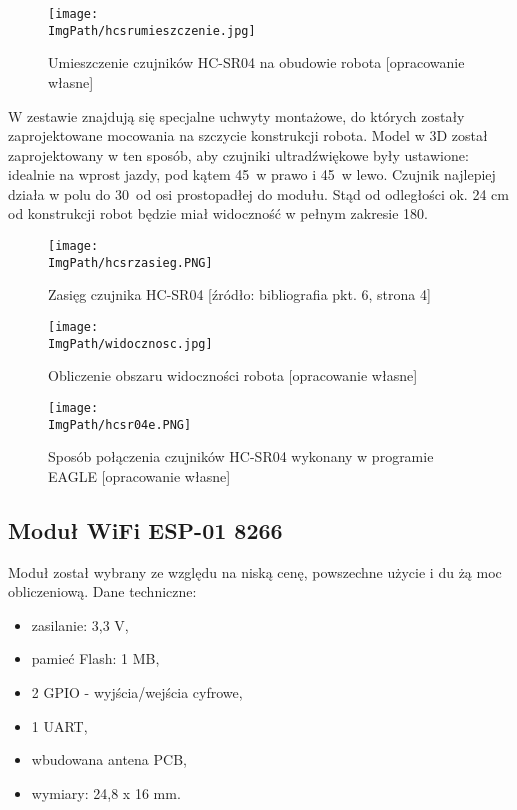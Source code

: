 \documentclass[a4paper,12pt,twoside,openany]{report}
\newcommand{\ImgPath}{.}
\begin{document}
\begin{figure}[!htbp]
	\begin{center}
\centering
\texttt{[image: \\ImgPath/hcsrumieszczenie.jpg]}
\end{center}
	\caption{Umieszczenie czujników HC-SR04 na obudowie robota [opracowanie własne]}
	\label{schematKomunikacji}
\end{figure}

W zestawie znajdują się specjalne uchwyty montażowe, do których zostały zaprojektowane mocowania na szczycie konstrukcji robota. Model w 3D został zaprojektowany w ten sposób, aby czujniki ultradźwiękowe były ustawione: idealnie na wprost jazdy, pod kątem 45\textdegree w prawo i 45\textdegree w lewo. Czujnik najlepiej działa w polu do 30\textdegree od osi prostopadłej do modułu. Stąd od odległości ok. 24 cm od konstrukcji robot będzie miał widoczność w pełnym zakresie 180\textdegree .

\begin{figure}[!htbp]
	\begin{center}
\centering
\texttt{[image: \\ImgPath/hcsrzasieg.PNG]}
\end{center}
	\caption{Zasięg czujnika HC-SR04 [źródło: bibliografia pkt. 6, strona 4]}
	\label{schematKomunikacji}
\end{figure}

\begin{figure}[!htbp]
	\begin{center}
\centering
\texttt{[image: \\ImgPath/widocznosc.jpg]}
\end{center}
	\caption{Obliczenie obszaru widoczności robota [opracowanie własne]}
	\label{schematKomunikacji}
\end{figure}

\begin{figure}[!htbp]
	\begin{center}
\texttt{[image: \\ImgPath/hcsr04e.PNG]}
\end{center}
	\caption{Sposób połączenia czujników HC-SR04 wykonany w programie EAGLE [opracowanie własne]}
	\label{schematKomunikacji}
\end{figure}

\newpage

\subsection{Moduł WiFi ESP-01 8266}

Moduł został wybrany ze względu na niską cenę, powszechne użycie i du żą moc obliczeniową. Dane techniczne:
\begin{itemize}
\item zasilanie: 3,3 V,
\item pamieć Flash: 1 MB,
\item 2 GPIO - wyjścia/wejścia cyfrowe,
\item 1 UART,
\item wbudowana antena PCB,
\item wymiary: 24,8 x 16 mm.
\end{itemize}
\end{document}
